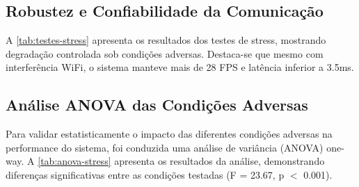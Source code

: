 \subsection{Robustez e Confiabilidade da Comunicação}
\label{subsec:robustez-comunicacao}

A \autoref{tab:testes-stress} apresenta os resultados dos testes de stress, mostrando degradação controlada sob condições adversas. Destaca-se que mesmo com interferência WiFi, o sistema manteve mais de 28 FPS e latência inferior a 3.5ms.

\begin{table}[!ht]
\captionsetup{width=16cm}
\end{table}

\subsection{Análise ANOVA das Condições Adversas}
\label{subsec:anova-condicoes}

Para validar estatisticamente o impacto das diferentes condições adversas na performance do sistema, foi conduzida uma análise de variância (ANOVA) one-way. A \autoref{tab:anova-stress} apresenta os resultados da análise, demonstrando diferenças significativas entre as condições testadas (F = 23.67, p $<$ 0.001).

